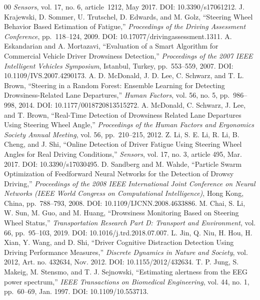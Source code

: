 \documentclass[letterpaper, 10 pt, conference]{ieeeconf}  %
\begin{document}
\begin{thebibliography}{00}
    \textit{Sensors}, vol. 17, no. 6, article~1212, May 2017. DOI: 10.3390/s17061212.
 J. Krajewski, D. Sommer, U. Trutschel, D. Edwards, and M. Golz,  
    ``Steering Wheel Behavior Based Estimation of Fatigue,''  
    \textit{Proceedings of the Driving Assessment Conference}, pp.~118--124, 2009. DOI: 10.17077/drivingassessment.1311.
 A. Eskandarian and A. Mortazavi,  
    ``Evaluation of a Smart Algorithm for Commercial Vehicle Driver Drowsiness Detection,''  
    \textit{Proceedings of the 2007 IEEE Intelligent Vehicles Symposium}, Istanbul, Turkey, pp.~553--559, 2007. DOI: 10.1109/IVS.2007.4290173.
 A. D. McDonald, J. D. Lee, C. Schwarz, and T. L. Brown,  
    ``Steering in a Random Forest: Ensemble Learning for Detecting Drowsiness-Related Lane Departures,''  
    \textit{Human Factors}, vol. 56, no. 5, pp.~986--998, 2014. DOI: 10.1177/0018720813515272.
 A. McDonald, C. Schwarz, J. Lee, and T. Brown,  
    ``Real-Time Detection of Drowsiness Related Lane Departures Using Steering Wheel Angle,''  
    \textit{Proceedings of the Human Factors and Ergonomics Society Annual Meeting}, vol. 56, pp.~210--215, 2012. %
 Z. Li, S. E. Li, R. Li, B. Cheng, and J. Shi,  
    ``Online Detection of Driver Fatigue Using Steering Wheel Angles for Real Driving Conditions,''  
    \textit{Sensors}, vol. 17, no. 3, article 495, Mar. 2017. DOI: 10.3390/s17030495.
 D. Sandberg and M. Wahde,  
    ``Particle Swarm Optimization of Feedforward Neural Networks for the Detection of Drowsy Driving,''  
    \textit{Proceedings of the 2008 IEEE International Joint Conference on Neural Networks (IEEE World Congress on Computational Intelligence)}, Hong Kong, China, pp.~788--793, 2008. DOI: 10.1109/IJCNN.2008.4633886.
 M. Chai, S. Li, W. Sun, M. Guo, and M. Huang,  
    ``Drowsiness Monitoring Based on Steering Wheel Status,''  
    \textit{Transportation Research Part D: Transport and Environment}, vol. 66, pp.~95--103, 2019. DOI: 10.1016/j.trd.2018.07.007.
 L. Jin, Q. Niu, H. Hou, H. Xian, Y. Wang, and D. Shi,  
    ``Driver Cognitive Distraction Detection Using Driving Performance Measures,''  
    \textit{Discrete Dynamics in Nature and Society}, vol. 2012, Art. no. 432634, Nov. 2012. DOI: 10.1155/2012/432634.
 T. P. Jung, S. Makeig, M. Stensmo, and T. J. Sejnowski,  
    ``Estimating alertness from the EEG power spectrum,''  
    \textit{IEEE Transactions on Biomedical Engineering}, vol. 44, no. 1, pp.~60--69, Jan. 1997. DOI: 10.1109/10.553713.

\end{thebibliography}
\end{document}
